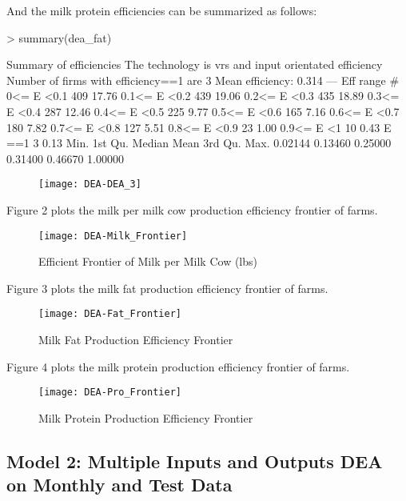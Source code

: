\documentclass[12pt,]{article}
\begin{document}
And the milk protein efficiencies can be summarized  as follows:
\begin{Schunk}
\begin{Sinput}
> summary(dea_fat)
\end{Sinput}
\begin{Soutput}
Summary of efficiencies
The technology is vrs and input orientated efficiency
Number of firms with efficiency==1 are 3 
Mean efficiency: 0.314 
---                
  Eff range        #     %
  0<= E <0.1     409 17.76
  0.1<= E <0.2   439 19.06
  0.2<= E <0.3   435 18.89
  0.3<= E <0.4   287 12.46
  0.4<= E <0.5   225  9.77
  0.5<= E <0.6   165  7.16
  0.6<= E <0.7   180  7.82
  0.7<= E <0.8   127  5.51
  0.8<= E <0.9    23  1.00
  0.9<= E <1      10  0.43
        E ==1      3  0.13
   Min. 1st Qu.  Median    Mean 3rd Qu.    Max. 
0.02144 0.13460 0.25000 0.31400 0.46670 1.00000 
\end{Soutput}
\end{Schunk}

\begin{figure}[h]
\texttt{[image: DEA-DEA\_3]}
\end{figure}


Figure 2 plots the milk per milk cow production efficiency frontier of farms.

\begin{figure}[h]
\texttt{[image: DEA-Milk\_Frontier]}
\caption{Efficient Frontier of Milk per Milk Cow (lbs)}
\end{figure}

Figure 3 plots the milk fat production efficiency frontier of farms.

\begin{figure}[h]
\texttt{[image: DEA-Fat\_Frontier]}
\caption{Milk Fat Production Efficiency Frontier}
\end{figure}

\newpage
Figure 4 plots the milk protein production efficiency frontier of farms.
\begin{figure}[h]
\texttt{[image: DEA-Pro\_Frontier]}
\caption{Milk Protein Production Efficiency Frontier}
\end{figure}




\newpage
\subsection{Model 2: Multiple Inputs and Outputs DEA on Monthly and Test Data}
\end{document}
